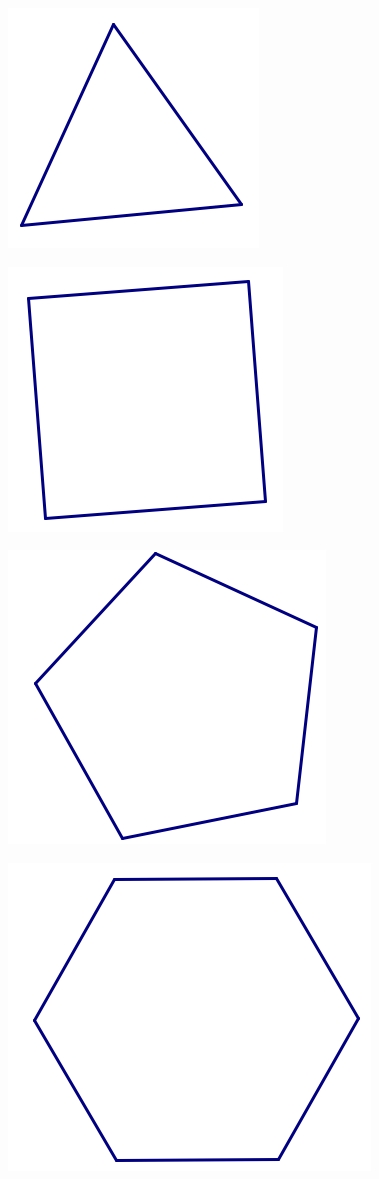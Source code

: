 \begin{center}
\includegraphics{eqtri}

\includegraphics{square3}

\includegraphics{pentagon}

\includegraphics[scale = .75]{hexagon}


\end{center}
